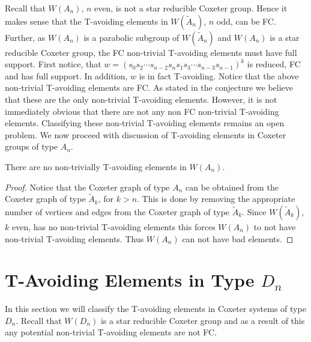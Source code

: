Recall that $W(A_n)$, $n$ even, is not a star reducible Coxeter group. Hence it makes sense that the T-avoiding elements in $W(\widetilde{A}_n)$, $n$ odd, can be FC. Further, as $W(A_n)$ is a parabolic subgroup of $W(\widetilde{A}_n)$ and $W(A_n)$ is a star reducible Coxeter group, the FC non-trivial T-avoiding elements must have full support. First notice, that $w=(s_0s_2 \cdots s_{n-2}s_ns_1s_3 \cdots s_{n-3}s_{n-1})^k$ is reduced, FC and has full support. In addition, $w$ is in fact T-avoiding. Notice that the above non-trivial T-avoiding elements are FC. As stated in the conjecture we believe that these are the only non-trivial T-avoiding elements. However, it is not immediately obvious that there are not any non FC non-trivial T-avoiding elements. Classifying these non-trivial T-avoiding elements remains an open problem. We now proceed with discussion of T-avoiding elements in Coxeter groups of type $A_n$. 

\begin{corollary}
There are no non-trivially T-avoiding elements in $W(A_n)$. 
\begin{proof}
Notice that the Coxeter graph of type $A_n$ can be obtained from the Coxeter graph of type $\widetilde{A}_k$, for $k > n$. This is done by removing the appropriate number of vertices and edges from the Coxeter graph of type $\widetilde{A}_k$. Since $W(\widetilde{A}_k)$, $k$ even, has no non-trivial T-avoiding elements this forces $W(A_n)$ to not have non-trivial T-avoiding elements. Thus $W(A_n)$ can not have bad elements.  
\end{proof}
\end{corollary}



\section{T-Avoiding Elements in Type $D_n$}

In this section we will classify the T-avoiding elements in Coxeter systems of type $D_n$. Recall that $W(D_n)$ is a star reducible Coxeter group and as a result of this any potential non-trivial T-avoiding elements are not FC.


